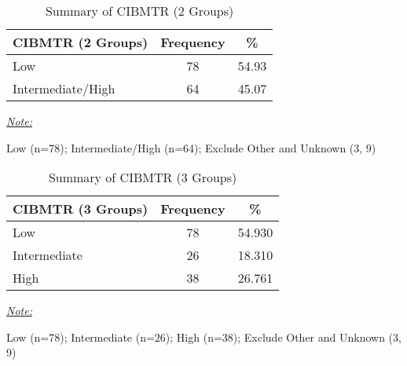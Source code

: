 \documentclass[12pt,]{article}
\begin{document}
\begin{table}[!h]

\caption{\label{tab:unnamed-chunk-41}Summary of CIBMTR (2 Groups)}
\centering
\begin{threeparttable}
\begin{tabular}{>{\centering\arraybackslash}p{5cm}cc}
\toprule
CIBMTR (2 Groups) & Frequency & \%\\
\midrule
Low & 78 & 54.93\\
\rowcolor[HTML]{E3E5E7}  Intermediate/High & 64 & 45.07\\
\bottomrule
\end{tabular}
\begin{tablenotes}[para]
\item \underline{\textit{Note:}} 
\item Low (n=78); Intermediate/High (n=64); Exclude Other and Unknown (3, 9)
\end{tablenotes}
\end{threeparttable}
\end{table}

\begin{table}[!h]

\caption{\label{tab:unnamed-chunk-41}Summary of CIBMTR (3 Groups)}
\centering
\begin{threeparttable}
\begin{tabular}{>{\centering\arraybackslash}p{5cm}cc}
\toprule
CIBMTR (3 Groups) & Frequency & \%\\
\midrule
Low & 78 & 54.930\\
\rowcolor[HTML]{E3E5E7}  Intermediate & 26 & 18.310\\
High & 38 & 26.761\\
\bottomrule
\end{tabular}
\begin{tablenotes}[para]
\item \underline{\textit{Note:}} 
\item Low (n=78); Intermediate (n=26); High (n=38); Exclude Other and Unknown (3, 9)
\end{tablenotes}
\end{threeparttable}
\end{table}

\pagebreak
\end{document}
